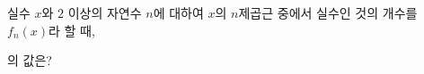 실수 $x$와 $2$ 이상의 자연수 $n$에 대하여 $x$의 $n$제곱근 중에서 실수인 것의 개수를 $f_n(x)$라 할 때,\par\smallskip{}\par\smallskip\noindent 의 값은?
